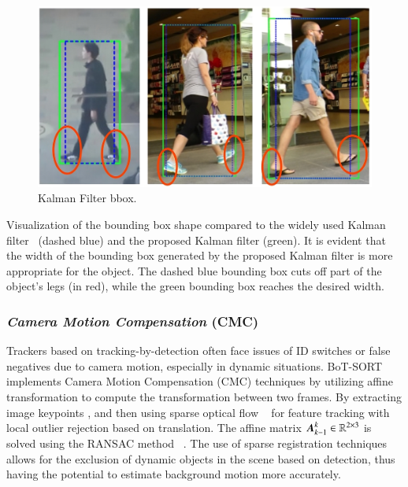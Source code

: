 \begin{figure}[H]
  \centering
  \includegraphics[scale=0.19]{gambar/KF_width.png}
  \caption{Kalman Filter bbox.}
  \label{fig:KF width}
\end{figure}

Visualization of the bounding box shape compared to the widely used Kalman filter~\cite{wojke2017simple} (dashed blue) and the proposed Kalman filter (green). It is evident that the width of the bounding box generated by the proposed Kalman filter is more appropriate for the object. The dashed blue bounding box cuts off part of the object's legs (in red), while the green bounding box reaches the desired width.

\vspace{5pt}
\subsubsection{\emph{Camera Motion Compensation} (CMC)}
\label{subsubsec:Camera Motion Compensation}

Trackers based on tracking-by-detection often face issues of ID switches or false negatives due to camera motion, especially in dynamic situations. BoT-SORT implements Camera Motion Compensation (CMC) techniques by utilizing affine transformation to compute the transformation between two frames. By extracting image keypoints \cite{shi1994good}, and then using sparse optical flow ~\cite{Bouguet1999PyramidalIO} for feature tracking with local outlier rejection based on translation. The affine matrix $\vb*{A}_{k-1}^k\in \mathbb{R}^{2 \times 3}$ is solved using the RANSAC method ~\cite{fischler1981random}. The use of sparse registration techniques allows for the exclusion of dynamic objects in the scene based on detection, thus having the potential to estimate background motion more accurately.

